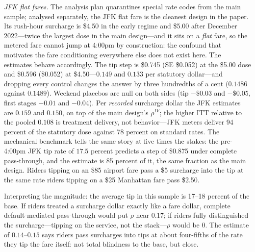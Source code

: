 \emph{JFK flat fares.} The analysis plan quarantines special rate codes
from the main sample; analysed separately, the JFK flat fare is the
cleanest design in the paper. Its rush-hour surcharge is \$4.50 in the
early regime and \$5.00 after December 2022---twice the largest dose in
the main design---and it sits on a \emph{flat} fare, so the metered fare
cannot jump at 4:00pm by construction: the confound that motivates the
fare conditioning everywhere else does not exist here. The estimates
behave accordingly. The tip step is \$0.745 (SE \$0.052) at the \$5.00
dose and \$0.596 (\$0.052) at \$4.50---$0.149$ and $0.133$ per
statutory dollar---and dropping every control changes the answer by
three hundredths of a cent ($0.1486$ against $0.1489$). Weekend
placebos are null on both sides (tip $-\$0.03$ and $-\$0.05$, first
stages $-0.01$ and $-0.04$). Per \emph{recorded} surcharge dollar the
JFK estimates are $0.159$ and $0.150$, on top of the main design's
$\rho^{IV}$; the higher ITT relative to the pooled $0.108$ is treatment
delivery, not behavior---JFK meters deliver 94 percent of the statutory
dose against 78 percent on standard rates. The mechanical benchmark
tells the same story at five times the stakes: the pre-4:00pm JFK tip
rate of $17.5$ percent predicts a step of \$0.875 under complete
pass-through, and the estimate is 85 percent of it, the same fraction
as the main design. Riders tipping on an \$85 airport fare pass a \$5
surcharge into the tip at the same rate riders tipping on a \$25
Manhattan fare pass \$2.50.

Interpreting the magnitude: the average tip in this sample is 17--18
percent of the base. If riders treated a surcharge dollar exactly like a
fare dollar, complete default-mediated pass-through would put $\rho$
near $0.17$; if riders fully distinguished the surcharge---tipping on
the service, not the stack---$\rho$ would be $0$. The estimate of
$0.14$--$0.15$ says riders pass surcharges into tips at about
four-fifths of the rate they tip the fare itself: not total blindness to
the base, but close.

